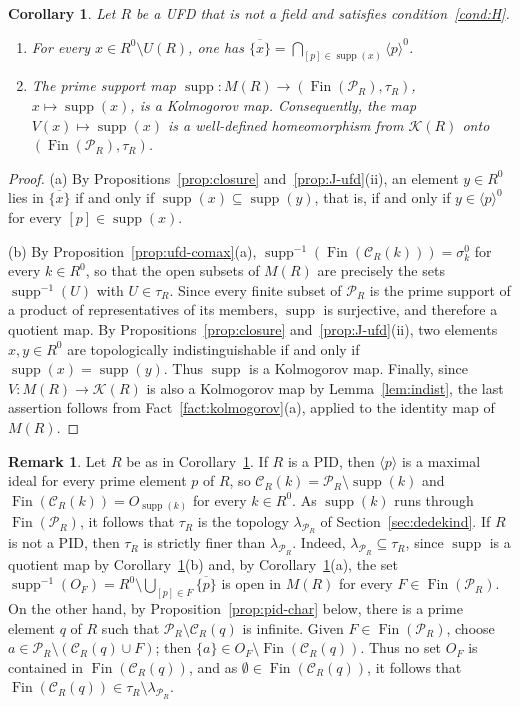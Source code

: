 \documentclass[12pt,reqno,a4paper]{amsart}
\newcommand{\Pe}{\mathcal{P}}
\newcommand{\K}{\mathcal{K}}
\newcommand{\clo}[1]{\overline{\{#1\}}}
\DeclareMathOperator{\Fin}{Fin}
\DeclareMathOperator{\supp}{supp}
\theoremstyle{plain}
\newtheorem{corollary}[theorem]{Corollary}
\theoremstyle{definition}
\newtheorem{remark}[theorem]{Remark}
\begin{document}
\begin{corollary}\label{cor:ufd-kq}
Let $R$ be a UFD that is not a field and satisfies condition~\ref{cond:H}.
\begin{enumerate}[label=\textup{(\alph*)}]
\item For every $x\in R^0\setminus U(R)$, one has $\clo{x}=\bigcap\limits_{[p]\in\supp(x)}\langle p\rangle^0$.
\item The prime support map $\supp\colon M(R)\to(\Fin(\Pe_R),\tau_R)$, $x\mapsto\supp(x)$, is a Kolmogorov map. Consequently, the map $V(x)\mapsto\supp(x)$ is a well-defined homeomorphism from $\K(R)$ onto $(\Fin(\Pe_R),\tau_R)$.
\end{enumerate}
\end{corollary}
\begin{proof}
(a) By Propositions~\ref{prop:closure} and~\ref{prop:J-ufd}(ii), an element $y\in R^0$ lies in $\clo{x}$ if and only if $\supp(x)\subseteq\supp(y)$, that is, if and only if $y\in\langle p\rangle^0$ for every $[p]\in\supp(x)$.

(b) By Proposition~\ref{prop:ufd-comax}(a), $\supp^{-1}(\Fin(\mathcal{C}_R(k)))=\sigma_k^0$ for every $k\in R^0$, so that the open subsets of $M(R)$ are precisely the sets $\supp^{-1}(U)$ with $U\in\tau_R$. Since every finite subset of $\Pe_R$ is the prime support of a product of representatives of its members, $\supp$ is surjective, and therefore a quotient map. By Propositions~\ref{prop:closure} and~\ref{prop:J-ufd}(ii), two elements $x,y\in R^0$ are topologically indistinguishable if and only if $\supp(x)=\supp(y)$. Thus $\supp$ is a Kolmogorov map. Finally, since $V\colon M(R)\to\K(R)$ is also a Kolmogorov map by Lemma~\ref{lem:indist}, the last assertion follows from Fact~\ref{fact:kolmogorov}(a), applied to the identity map of $M(R)$.
\end{proof}
\begin{remark}\label{rem:tau-lambda}
Let $R$ be as in Corollary~\ref{cor:ufd-kq}. If $R$ is a PID, then $\langle p\rangle$ is a maximal ideal for every prime element $p$ of $R$, so $\mathcal{C}_R(k)=\Pe_R\setminus\supp(k)$ and $\Fin(\mathcal{C}_R(k))=O_{\supp(k)}$ for every $k\in R^0$. As $\supp(k)$ runs through $\Fin(\Pe_R)$, it follows that $\tau_R$ is the topology $\lambda_{\Pe_R}$ of Section~\ref{sec:dedekind}. If $R$ is not a PID, then $\tau_R$ is strictly finer than $\lambda_{\Pe_R}$. Indeed, $\lambda_{\Pe_R}\subseteq\tau_R$, since $\supp$ is a quotient map by Corollary~\ref{cor:ufd-kq}(b) and, by Corollary~\ref{cor:ufd-kq}(a), the set $\supp^{-1}(O_F)=R^0\setminus\bigcup\limits_{[p]\in F}\clo{p}$ is open in $M(R)$ for every $F\in\Fin(\Pe_R)$. On the other hand, by Proposition~\ref{prop:pid-char} below, there is a prime element $q$ of $R$ such that $\Pe_R\setminus\mathcal{C}_R(q)$ is infinite. Given $F\in\Fin(\Pe_R)$, choose $a\in\Pe_R\setminus(\mathcal{C}_R(q)\cup F)$; then $\{a\}\in O_F\setminus\Fin(\mathcal{C}_R(q))$. Thus no set $O_F$ is contained in $\Fin(\mathcal{C}_R(q))$, and as $\emptyset\in\Fin(\mathcal{C}_R(q))$, it follows that $\Fin(\mathcal{C}_R(q))\in\tau_R\setminus\lambda_{\Pe_R}$.
\end{remark}
\end{document}
